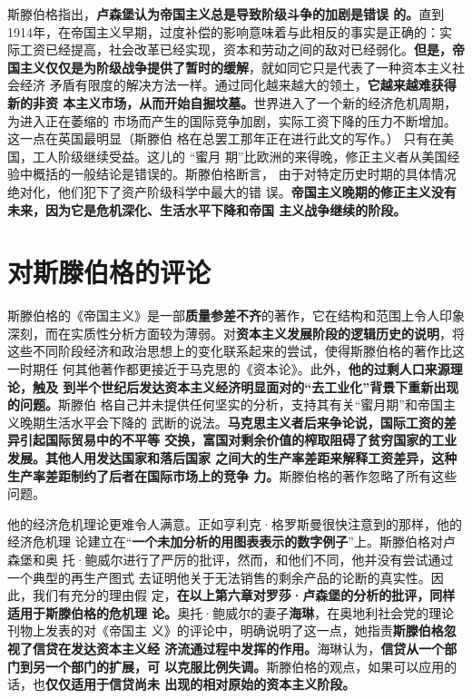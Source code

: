 斯滕伯格指出，\textbf{卢森堡认为帝国主义总是导致阶级斗争的加剧是错误
  的。}直到1914年，在帝国主义早期，过度补偿的影响意味着与此相反的事实是正确的：实
际工资已经提高，社会改革已经实现，资本和劳动之间的敌对已经弱化。\textbf{但是，帝
  国主义仅仅是为阶级战争提供了暂时的缓解}，就如同它只是代表了一种资本主义社会经济
矛盾有限度的解决方法一样。通过同化越来越大的领土，\textbf{它越来越难获得新的非资
  本主义市场，从而开始自掘坟墓。}世界进入了一个新的经济危机周期，为进入正在萎缩的
市场而产生的国际竞争加剧，实际工资下降的压力不断增加。这一点在英国最明显（斯滕伯
格在总罢工那年正在进行此文的写作。） 只有在美国，工人阶级继续受益。这儿的 “蜜月
期”比欧洲的来得晚，修正主义者从美国经验中概括的一般结论是错误的。斯滕伯格断言，
由于对特定历史时期的具体情况绝对化，他们犯下了资产阶级科学中最大的错
误。\textbf{帝国主义晚期的修正主义没有未来，因为它是危机深化、生活水平下降和帝国
  主义战争继续的阶段。}

\section{对斯滕伯格的评论}

斯滕伯格的《帝国主义》是一部\textbf{质量参差不齐}的著作，它在结构和范围上令人印象
深刻，而在实质性分析方面较为薄弱。对\textbf{资本主义发展阶段的逻辑历史的说明}，将
这些不同阶段经济和政治思想上的变化联系起来的尝试，使得斯滕伯格的著作比这一时期任
何其他著作都更接近于马克思的《资本论》。此外，\textbf{他的过剩人口来源理论，触及
  到半个世纪后发达资本主义经济明显面对的“去工业化”背景下重新出现的问题。}斯滕伯
格自己并未提供任何坚实的分析，支持其有关“蜜月期”和帝国主义晚期生活水平会下降的
武断的说法。\textbf{马克思主义者后来争论说，国际工资的差异引起国际贸易中的不平等
  交换，富国对剩余价值的榨取阻碍了贫穷国家的工业发展。其他人用发达国家和落后国家
  之间大的生产率差距来解释工资差异，这种生产率差距制约了后者在国际市场上的竞争
  力。}斯滕伯格的著作忽略了所有这些问题。

他的经济危机理论更难令人满意。正如亨利克·格罗斯曼很快注意到的那样，他的经济危机理
论建立在“\textbf{一个未加分析的用图表表示的数字例子}”上。斯滕伯格对卢森堡和奥
托·鲍威尔进行了严厉的批评，然而，和他们不同，他并没有尝试通过一个典型的再生产图式
去证明他关于无法销售的剩余产品的论断的真实性。因此，我们有充分的理由假
定，\textbf{在以上第六章对罗莎·卢森堡的分析的批评，同样适用于斯滕伯格的危机理
  论。}奥托·鲍威尔的妻子\textbf{海琳}，在奥地利社会党的理论刊物上发表的对《帝国主
义》的评论中，明确说明了这一点，她指责\textbf{斯滕伯格忽视了信贷在发达资本主义经
  济流通过程中发挥的作用。}海琳认为，\textbf{信贷从一个部门到另一个部门的扩展，可
  以克服比例失调。}斯滕伯格的观点，如果可以应用的话，也\textbf{仅仅适用于信贷尚未
  出现的相对原始的资本主义阶段。}


